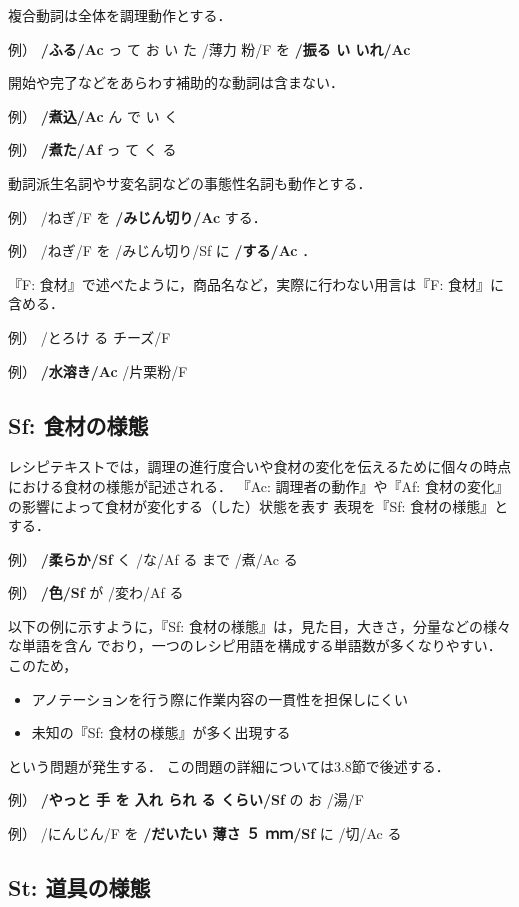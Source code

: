\documentclass[japanese]{jnlp_1.4}
\begin{document}
複合動詞は全体を調理動作とする．

\quad \noindent 例） {\bf /ふる/Ac} っ て お い た /薄力 粉/F  を {\bf /振る い いれ/Ac}

開始や完了などをあらわす補助的な動詞は含まない．

\quad \noindent 例） {\bf /煮込/Ac} ん で い く

\quad \noindent 例） {\bf /煮た/Af} っ て く る

動詞派生名詞やサ変名詞などの事態性名詞も動作とする．

\quad \noindent 例） /ねぎ/F を {\bf /みじん切り/Ac} する．

\quad \noindent 例） /ねぎ/F を /みじん切り/Sf に {\bf /する/Ac} ．

『F: 食材』で述べたように，商品名など，実際に行わない用言は『F: 食材』に含める．

\quad \noindent 例） /とろけ る チーズ/F

\quad \noindent 例） {\bf /水溶き/Ac} /片栗粉/F


\subsection{Sf: 食材の様態}

レシピテキストでは，調理の進行度合いや食材の変化を伝えるために個々の時点
における食材の様態が記述される．
『Ac: 調理者の動作』や『Af: 食材の変化』の影響によって食材が変化する（した）状態を表す
表現を『Sf: 食材の様態』とする．

\quad \noindent 例） {\bf /柔らか/Sf} く /な/Af る まで /煮/Ac る

\quad \noindent 例） {\bf /色/Sf} が /変わ/Af る

以下の例に示すように，『Sf: 食材の様態』は，見た目，大きさ，分量などの様々な単語を含ん
でおり，一つのレシピ用語を構成する単語数が多くなりやすい．このため，
\begin{itemize}
 \item アノテーションを行う際に作業内容の一貫性を担保しにくい
 \item 未知の『Sf: 食材の様態』が多く出現する
\end{itemize}
という問題が発生する．
この問題の詳細については3.8節で後述する．

\quad \noindent 例） {\bf /やっと 手 を 入れ られ る くらい/Sf} の お /湯/F

\quad \noindent 例） /にんじん/F を {\bf /だいたい 薄さ ５ ｍｍ/Sf} に /切/Ac る


\subsection{St: 道具の様態}
\end{document}
